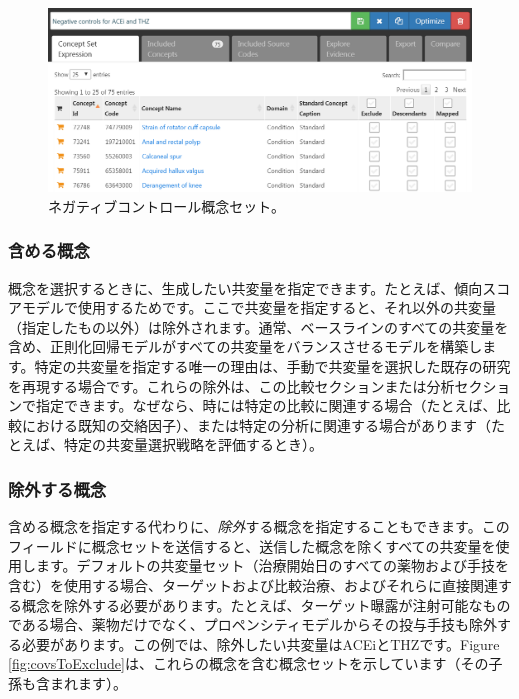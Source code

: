 \documentclass[
  11pt]{book}
\theoremstyle{definition}
\theoremstyle{definition}
\theoremstyle{definition}
\theoremstyle{definition}
\theoremstyle{remark}
\begin{document}
\begin{figure}

{\centering \includegraphics[width=1\linewidth]{images/PopulationLevelEstimation/ncConceptSet} 

}

\caption{ネガティブコントロール概念セット。}\label{fig:ncConceptSet}
\end{figure}

\subsubsection*{含める概念}\label{ux542bux3081ux308bux6982ux5ff5}

概念を選択するときに、生成したい共変量を指定できます。たとえば、傾向スコアモデルで使用するためです。ここで共変量を指定すると、それ以外の共変量（指定したもの以外）は除外されます。通常、ベースラインのすべての共変量を含め、正則化回帰モデルがすべての共変量をバランスさせるモデルを構築します。特定の共変量を指定する唯一の理由は、手動で共変量を選択した既存の研究を再現する場合です。これらの除外は、この比較セクションまたは分析セクションで指定できます。なぜなら、時には特定の比較に関連する場合（たとえば、比較における既知の交絡因子）、または特定の分析に関連する場合があります（たとえば、特定の共変量選択戦略を評価するとき）。

\subsubsection*{除外する概念}\label{ux9664ux5916ux3059ux308bux6982ux5ff5}

含める概念を指定する代わりに、\emph{除外}する概念を指定することもできます。このフィールドに概念セットを送信すると、送信した概念を除くすべての共変量を使用します。デフォルトの共変量セット（治療開始日のすべての薬物および手技を含む）を使用する場合、ターゲットおよび比較治療、およびそれらに直接関連する概念を除外する必要があります。たとえば、ターゲット曝露が注射可能なものである場合、薬物だけでなく、プロペンシティモデルからその投与手技も除外する必要があります。この例では、除外したい共変量はACEiとTHZです。Figure \ref{fig:covsToExclude}は、これらの概念を含む概念セットを示しています（その子孫も含まれます）。
\end{document}
